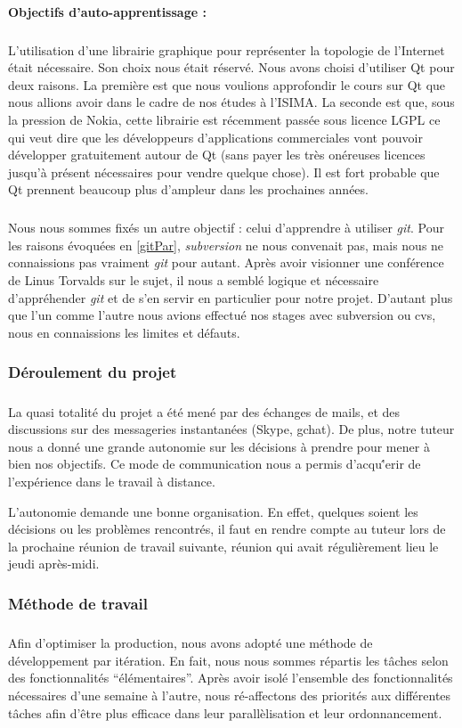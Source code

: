 \paragraph{Objectifs d'auto-apprentissage : }
\subparagraph{}
L'utilisation d'une librairie graphique pour représenter la topologie de l'Internet était nécessaire. Son choix nous était réservé. Nous avons choisi d'utiliser Qt pour deux raisons. La première est que nous voulions approfondir le cours sur Qt que nous allions avoir dans le cadre de nos études à l'ISIMA. La seconde est que, sous la pression de Nokia, cette librairie est récemment passée sous licence LGPL ce qui veut dire que les développeurs d'applications commerciales vont pouvoir développer gratuitement autour de Qt (sans payer les très onéreuses licences jusqu'à présent nécessaires pour vendre quelque chose). Il est fort probable que Qt prennent beaucoup plus d'ampleur dans les prochaines années.

\subparagraph{}
Nous nous sommes fixés un autre objectif : celui d'apprendre à utiliser \textit{git}. Pour les raisons évoquées en \ref{gitPar}, \textit{subversion} ne nous convenait pas, mais nous ne connaissions pas vraiment \textit{git} pour autant. Après avoir visionner une conférence de Linus Torvalds sur le sujet, il nous a semblé logique et nécessaire d'appréhender \textit{git} et de s'en servir en particulier pour notre projet. D'autant plus que l'un comme l'autre nous avions effectué nos stages avec subversion ou cvs, nous en connaissions les limites et d\'efauts.

\subsubsection{Déroulement du projet}
\subparagraph{}
La quasi totalité du projet a été mené par des échanges de mails, et des discussions sur des messageries instantanées (Skype, gchat). De plus, notre tuteur nous a donné une grande autonomie sur les décisions à prendre pour mener à bien nos objectifs. Ce mode de communication nous a permis d'acqu\''erir de l'expérience dans le travail à distance.

L'autonomie demande une bonne organisation. En effet, quelques soient les décisions ou les problèmes rencontrés, il faut en rendre compte au tuteur lors de la prochaine réunion de travail suivante, réunion qui avait régulièrement lieu le jeudi après-midi.

\subsubsection{Méthode de travail}
\subparagraph{}
Afin d'optimiser la production, nous avons adopté une méthode de développement par itération. En fait, nous nous sommes répartis les tâches selon des fonctionnalités ``élémentaires''. Après avoir isolé l'ensemble des fonctionnalités nécessaires d'une semaine à l'autre, nous ré-affectons des priorités aux différentes tâches afin d'être plus efficace dans leur parallèlisation et leur ordonnancement.

